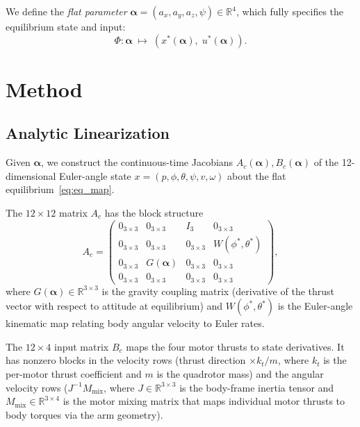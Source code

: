 \documentclass[letterpaper, 10pt, conference]{IEEEtran}
\newcommand{\R}{\mathbb{R}}
\newcommand{\balpha}{\bm{\alpha}}
\begin{document}
We define the \emph{flat parameter}
$\balpha = (a_x, a_y, a_z, \psi) \in \R^4$,
which fully specifies the equilibrium state and input:
\begin{equation}\label{eq:eq_map}
  \Phi: \balpha \;\mapsto\; (x^*(\balpha),\; u^*(\balpha)).
\end{equation}

\section{Method}\label{sec:method}

\subsection{Analytic Linearization}\label{sec:linearize}

Given $\balpha$, we construct the continuous-time Jacobians
$A_c(\balpha), B_c(\balpha)$ of the 12-dimensional
Euler-angle state
$x = (p, \phi, \theta, \psi, v, \omega)$
about the flat equilibrium~\eqref{eq:eq_map}.

The $12 \times 12$ matrix $A_c$ has the block structure
\begin{equation}\label{eq:Ac}
  A_c = \begin{pmatrix}
    0_{3\times3} & 0_{3\times3} & I_3 & 0_{3\times3} \\
    0_{3\times3} & 0_{3\times3} & 0_{3\times3} & W(\phi^*,\theta^*) \\
    0_{3\times3} & G(\balpha)   & 0_{3\times3} & 0_{3\times3} \\
    0_{3\times3} & 0_{3\times3} & 0_{3\times3} & 0_{3\times3}
  \end{pmatrix},
\end{equation}
where $G(\balpha) \in \R^{3\times3}$ is the gravity coupling matrix
(derivative of the thrust vector with respect to attitude at equilibrium)
and $W(\phi^*, \theta^*)$ is the Euler-angle kinematic map
relating body angular velocity to Euler rates.

The $12 \times 4$ input matrix $B_c$ maps the four motor
thrusts to state derivatives.
It has nonzero blocks in
the velocity rows (thrust direction $\times k_t / m$,
where $k_t$ is the per-motor thrust coefficient and
$m$ is the quadrotor mass)
and the angular velocity rows
($J^{-1} M_{\mathrm{mix}}$,
where $J \in \R^{3\times3}$ is the body-frame inertia
tensor and $M_{\mathrm{mix}} \in \R^{3\times4}$ is
the motor mixing matrix that maps individual motor
thrusts to body torques via the arm geometry).
\end{document}
